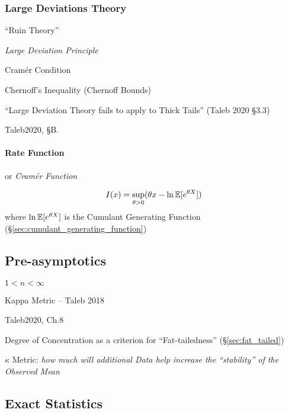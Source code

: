 \subsubsection{Large Deviations Theory}\label{sec:large_deviations_theory}

``Ruin Theory''

\emph{Large Deviation Principle}

Cram\'er Condition

Chernoff's Inequality (Chernoff Bounds)

``Large Deviation Theory fails to apply to Thick Tails'' (Taleb 2020 \S 3.3)

Taleb2020, \S B.



\paragraph{Rate Function}\label{sec:rate_function}\hfill

or \emph{Cram\'er Function}

\[
  I(x) = \sup_{\theta > 0} (\theta x - \ln \mathbb{E}[e^{\theta X}])
\]
where $\ln \mathbb{E}[e^{\theta X}]$ is the Cumulant Generating Function
(\S\ref{sec:cumulant_generating_function})



\subsection{Pre-asymptotics}\label{sec:preasymptotics}


$1 < n < \infty$

Kappa Metric -- Taleb 2018

Taleb2020, Ch.8

Degree of Concentration as a criterion for ``Fat-tailedness''
(\S\ref{sec:fat_tailed})

$\kappa$ Metric: \emph{how much will additional Data help increase the
``stability'' of the Observed Mean}



\subsection{Exact Statistics}\label{sec:exact_statistics}

